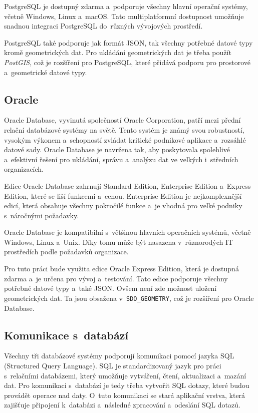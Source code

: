 PostgreSQL je dostupný zdarma a~podporuje všechny hlavní operační systémy, včetně Windows, Linux a~macOS. 
Tato multiplatformní dostupnost umožňuje snadnou integraci PostgreSQL do~různých vývojových prostředí.
\cite{postgresql}

PostgreSQL také podporuje jak formát JSON, tak všechny potřebné datové typy kromě geometrických dat.
Pro ukládání geometrických dat je třeba použít \textit{PostGIS}, což je rozšíření pro PostgreSQL, které přidává
podporu pro prostorové a~geometrické datové typy.

\subsection{Oracle}
Oracle Database, vyvinutá společností Oracle Corporation, patří mezi přední relační 
databázové systémy na světě. Tento systém je známý svou robustností, vysokým výkonem 
a~schopností zvládat kritické podnikové aplikace a~rozsáhlé datové sady. Oracle Database 
je navržena tak, aby poskytovala spolehlivé a~efektivní řešení pro ukládání, správu 
a~analýzu dat ve velkých i~středních organizacích.

Edice Oracle Database zahrnují Standard Edition, Enterprise Edition a~Express Edition,
které se liší funkcemi a~cenou. Enterprise Edition je nejkomplexnější edicí, která
obsahuje všechny pokročilé funkce a~je vhodná pro velké podniky s~náročnými požadavky.

Oracle Database je kompatibilní s~většinou hlavních operačních systémů, včetně Windows, 
Linux a~Unix. Díky tomu může být nasazena v~různorodých IT prostředích podle požadavků organizace.
\cite{oracle_database}

Pro tuto práci bude využita edice Oracle Express Edition, která je dostupná zdarma a~je určena pro vývoj a~testování.
Tato edice podporuje všechny potřebné datové typy a~také JSON. Ovšem není zde možnost 
uložení geometrických dat. Ta jsou obsažena v~\texttt{SDO\_GEOMETRY}, což je rozšíření pro Oracle Database.

\subsection{Komunikace s~databází}
Všechny tři databázové systémy podporují komunikaci pomocí jazyka SQL (Structured Query Language).
SQL je standardizovaný jazyk pro práci s~relačními databázemi,
který umožňuje vytváření, čtení, aktualizaci a~mazání dat.
Pro komunikaci s~databází je tedy třeba vytvořit SQL dotazy, které budou provádět operace nad daty.
O~tuto komunikaci se stará aplikační vrstva, která zajišťuje připojení k~databázi a~následné zpracování a~odeslání SQL dotazů.